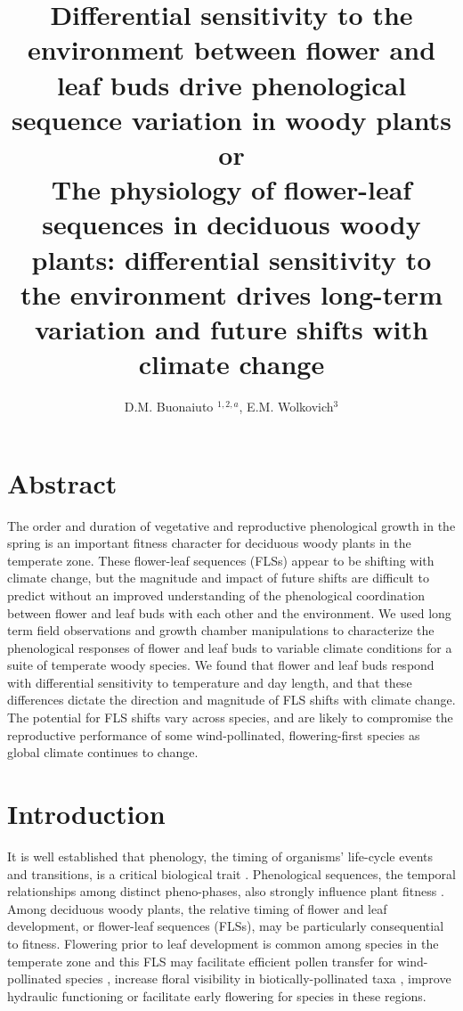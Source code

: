 \documentclass[11pt]{article}
\title{Differential sensitivity to the environment between flower and leaf buds drive phenological sequence variation in woody plants\\
or\\
The physiology of flower-leaf sequences in deciduous woody plants: differential sensitivity to the environment drives long-term variation and future shifts with climate change}
\date{}
\author{D.M. Buonaiuto $^{1,2,a}$, E.M. Wolkovich$^{3}$}
\begin{document}
\maketitle
\section*{Abstract}
The order and duration of vegetative and reproductive phenological growth in the spring is an important fitness character for deciduous woody plants in the temperate zone. These flower-leaf sequences (FLSs) appear to be shifting with climate change, but the magnitude and impact of future shifts are difficult to predict without an improved understanding of the phenological coordination between flower and leaf buds with each other and the environment. We used long term field observations and growth chamber manipulations to characterize the phenological responses of flower and leaf buds to variable climate conditions for a suite of temperate woody species. We found that flower and leaf buds respond with differential sensitivity to temperature and day length, and that these differences dictate the direction and magnitude of FLS shifts with climate change. The potential for FLS shifts vary across species, and are likely to compromise the reproductive performance of some wind-pollinated, flowering-first species as global climate continues to change.  %

\section*{Introduction}
\noindent It is well established that phenology, the timing of organisms' life-cycle events and transitions, is a critical biological trait \citep{}. Phenological sequences, the temporal relationships among distinct pheno-phases, also strongly influence plant fitness \citep{Ettinger2018,Savage2019,Chamberlin}. \\

\noindent Among deciduous woody plants, the relative timing of flower and leaf development, or flower-leaf sequences (FLSs), may be particularly consequential to fitness\citep{Gougherty2018}. Flowering prior to 
leaf development is common among species in the temperate zone and this FLS may facilitate efficient pollen transfer for wind-pollinated species \citep{Rathcke_1985}, increase floral visibility in biotically-pollinated taxa \citep{Janzen1967}, improve hydraulic functioning \citep{Gougherty2018,Reich1984} or facilitate early flowering \citep{Primack1987,Savage2019} for species in these regions.
\end{document}
